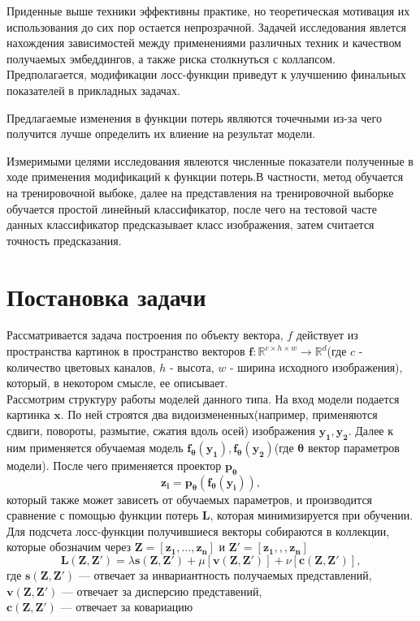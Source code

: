 \documentclass{article}
\begin{document}
Приденные выше техники эффективны практике, но теоретическая мотивация их использования до сих пор остается непрозрачной. 
Задачей исследования явлется нахождения зависимостей между применениями различных техник и качеством получаемых эмбеддингов, а также риска столкнуться с коллапсом. Предполагается, модификации лосс-функции приведут к улучшению финальных показателей в прикладных задачах. 

Предлагаемые изменения в функции потерь являются точечными из-за чего получится лучше определить их влиение на результат модели.

Измеримыми целями исследования явлеются численные показатели полученные в ходе применения модификаций к функции потерь.В частности, метод обучается на тренировочной выбоке, далее на представления на тренировочной выборке обучается простой линейный классификатор, после чего на тестовой часте данных классификатор предсказывает класс изображения, затем считается точность предсказания.





\section{Постановка задачи}


Рассматривается задача построения по объекту вектора, $f$ действует из пространства картинок в пространство векторов $\bm{f}: \mathbb{R}^{c \times h \times w} \rightarrow  \mathbb{R}^d$(где $c$ - количество цветовых каналов, $h$ - высота, $w$ - ширина исходного изображения), \\ который, в некотором смысле, ее описывает.\\


Рассмотрим структуру работы  моделей данного типа.
На вход модели подается картинка $\bm{x}$. По ней строятся два видоизмененных(например, применяются сдвиги, повороты, размытие, сжатия вдоль осей) изображения $\bm{y_1, y_2}$. Далее к ним применяется обучаемая модель $\bm{f_{\theta}}(\bm{y_1}), \bm{f_{\theta}}(\bm{y_2})$(где $\bm{\theta}$ вектор параметров модели). После чего применяется проектор $\bm{p_{\theta}}$
\[\bm{z_i} = \bm{p_{\theta}}(\bm{f_{\theta}}(\bm{y_i})),\] который также может зависеть от обучаемых параметров, и производится сравнение с помощью функции потерь $\bm{L}$, которая минимизируется при обучении. Для подсчета лосс-функции получившиеся векторы собираются в коллекции, которые обозначим через $\bm{Z} = [\bm{z_1},...,\bm{z_n}]$ и $\bm{Z'} = [\bm{z_1},,,\bm{z_n}]$
\[\bm{L}(\bm{Z}, \bm{Z'}) = \lambda \bm{s}(\bm{Z}, \bm{Z'}) + \mu [\bm{v}(\bm{Z}, \bm{Z'})] + \nu [\bm{c}(\bm{Z}, \bm{Z'})],\] где
$\bm{s}(\bm{Z}, \bm{Z'})$ --- отвечает за инвариантность получаемых представлений,\\
$\bm{v}(\bm{Z}, \bm{Z'})$ --- отвечает за дисперсию представений, \\
$\bm{c}(\bm{Z}, \bm{Z'})$ --- отвечает за ковариацию
\end{document}

